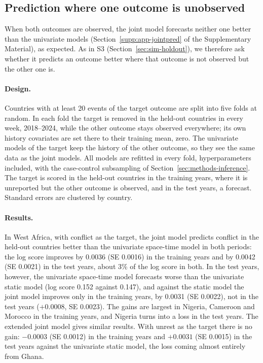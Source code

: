 \subsection{Prediction where one outcome is unobserved}\label{sec:app-holdout}

When both outcomes are observed, the joint model forecasts neither one better than
the univariate models (Section~\ref{supp:app-jointpred} of the Supplementary
Material), as expected. As in S3 (Section~\ref{sec:sim-holdout}), we therefore ask
whether it predicts an outcome better where that outcome is not observed but the
other one is.

\paragraph{Design.} Countries with at least 20 events of the target outcome are split
into five folds at random. In each fold the target is removed in the held-out
countries in every week, 2018--2024, while the other outcome stays observed
everywhere; its own history covariates are set there to their training mean, zero.
The univariate models of the target keep the history of the other outcome, so they
see the same data as the joint models. All models are refitted in every fold,
hyperparameters included, with the case-control subsampling of
Section~\ref{sec:methods-inference}. The target is scored in the held-out countries
in the training years, where it is unreported but the other outcome is observed, and
in the test years, a forecast. Standard errors are clustered by country.

\paragraph{Results.} In West Africa, with conflict as the target, the joint model
predicts conflict in the held-out countries better than the univariate space-time
model in both periods: the log score improves by 0.0036 (SE 0.0016) in the training
years and by 0.0042 (SE 0.0021) in the test years, about 3\% of the log score in
both. In the test years, however, the univariate space-time model forecasts worse than
the univariate static model (log score 0.152 against 0.147), and against the static
model the joint model improves only in the training years, by 0.0031 (SE 0.0022), not
in the test years ($+0.0008$, SE 0.0023). The gains are
largest in Nigeria, Cameroon and Morocco in the training years, and Nigeria turns into
a loss in the test years. The extended joint model gives similar results. With unrest
as the target there is no gain: $-0.0003$ (SE 0.0012) in the training years and
$+0.0031$ (SE 0.0015) in the test years against the univariate static model, the loss
coming almost entirely from Ghana. 

